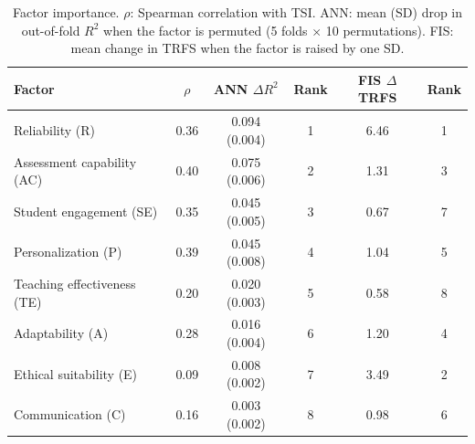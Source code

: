 \begin{table}[!htbp]
\centering
\caption{Factor importance. $\rho$: Spearman correlation with TSI. ANN: mean (SD) drop in out-of-fold $R^2$ when the factor is permuted (5 folds $\times$ 10 permutations). FIS: mean change in TRFS when the factor is raised by one SD.}
\label{tab:importance}
\footnotesize
\setlength{\tabcolsep}{3.5pt}
\begin{tabular}{lccccc}
\toprule
Factor & $\rho$ & ANN $\Delta R^2$ & Rank & FIS $\Delta$TRFS & Rank \\
\midrule
Reliability (R) & 0.36 & 0.094 (0.004) & 1 & 6.46 & 1\\
Assessment capability (AC) & 0.40 & 0.075 (0.006) & 2 & 1.31 & 3\\
Student engagement (SE) & 0.35 & 0.045 (0.005) & 3 & 0.67 & 7\\
Personalization (P) & 0.39 & 0.045 (0.008) & 4 & 1.04 & 5\\
Teaching effectiveness (TE) & 0.20 & 0.020 (0.003) & 5 & 0.58 & 8\\
Adaptability (A) & 0.28 & 0.016 (0.004) & 6 & 1.20 & 4\\
Ethical suitability (E) & 0.09 & 0.008 (0.002) & 7 & 3.49 & 2\\
Communication (C) & 0.16 & 0.003 (0.002) & 8 & 0.98 & 6\\
\bottomrule
\end{tabular}
\end{table}
